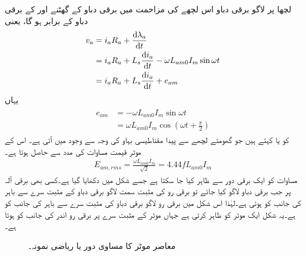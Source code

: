 لچھا  پر لاگو برقی دباو اس لچھے کی مزاحمت  میں برقی دباو کے گھٹنے اور  کے برقی دباو کے برابر ہو گا، یعنی
\begin{gather}
\begin{aligned}\label{مساوات_معاصر_دباو_مساوی_مزاحمت_گھتاو_اور_پیدا_دباو}
v_a&=i_a R_a+\frac{\dif \lambda_a}{\dif t}\\
&=i_a R_a+L_s \frac{\dif i_a}{\dif t}-\omega L_{am0} I_m \sin \omega t\\
&=i_a R_a+L_s \frac{\dif i_a}{\dif t}+e_{am}
\end{aligned}
\end{gather}
یہاں
\begin{gather}
\begin{aligned}
e_{am}&=-\omega L_{am0} I_m \sin \omega t\\
&=\omega L_{am0} I_m \cos \left (\omega t+\frac{\pi}{2} \right)
\end{aligned}
\end{gather}
کو  یا  کہتے ہیں جو گھومتے لچھے سے پیدا مقناطیسی بہاو کی وجہ سے وجود میں آتی ہے۔  اس کے موثر قیمت  مساوات   کی مدد سے حاصل ہوتا ہے۔
\begin{align}\label{مساوات_معاصر_موثر_پیدا_دباو}
E_{am,rms}=\frac{\omega L_{am0} I_m}{\sqrt{2}}=4.44 f L_{am0} I_m
\end{align}
مساوات   کو ایک برقی دور سے ظاہر کیا جا سکتا ہے جسے شکل   میں دکھایا گیا ہے۔کسی بھی برقی آلہ پر جب برقی دباو لاگو کیا جائے تو برقی رو کی مثبت سمت لاگو برقی دباو کے مثبت سرے سے باہر کی جانب کو ہوتی ہے۔لہٰذا اس شکل میں برقی رو  لاگو برقی دباو  کی مثبت سرے سے باہر کی جانب کو ہے۔یہ شکل ایک موٹر کو ظاہر کرتی ہے جہاں موٹر کے مثبت سرے پر برقی رو اندر کی جانب کو ہوتا ہے۔
\begin{figure}
\centering
\caption{معاصر موٹر کا مساوی دور یا ریاضی نمونہ۔}
\label{شکل_معاصر_موٹر_کا_مساوی_دور}
\end{figure}

